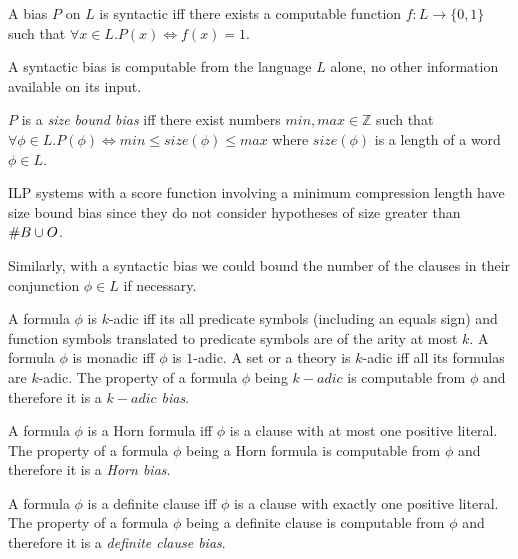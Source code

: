 \begin{defn}
A bias $P$ on $L$ is syntactic iff there exists a computable function $f:L \to \{0,1\}$ such that $\forall x \in L.P(x) \iff f(x)=1$.
\end{defn}

\begin{remark}
A syntactic bias is computable from the language $L$ alone, no other information available on its input.
\end{remark}

\begin{defn}
$P$ is a \emph{size bound bias} iff there exist numbers $min, max \in \mathbb{Z}$ such that $\forall \phi \in L. P(\phi) \iff min \le size(\phi) \le max$ where $size(\phi)$ is a length of a word $\phi \in L$.
\end{defn}

\begin{remark}
ILP systems with a score function involving a minimum compression length have size bound bias since they do not consider hypotheses of size greater than $\#B \cup O$.
\end{remark}

\begin{remark}
Similarly, with a syntactic bias we could bound the number of the clauses in their conjunction $\phi \in L$ if necessary.
\end{remark}

\begin{defn}
A formula $\phi$ is $k$-adic iff its all predicate symbols (including an equals sign) and function symbols translated to predicate symbols are of the arity at most $k$. A formula $\phi$ is monadic iff $\phi$ is $1$-adic. A set or a theory is $k$-adic iff all its formulas are $k$-adic. The property of a formula $\phi$ being $k-adic$ is computable from $\phi$ and therefore it is a \emph{$k-adic$ bias}.
\end{defn}

\begin{defn}
A formula $\phi$ is a Horn formula iff $\phi$ is a clause with at most one positive literal. The property of a formula $\phi$ being a Horn formula is computable from $\phi$ and therefore it is a \emph{Horn bias}.
\end{defn}

\begin{defn}
A formula $\phi$ is a definite clause iff $\phi$ is a clause with exactly one positive literal. The property of a formula $\phi$ being a definite clause is computable from $\phi$ and therefore it is a \emph{definite clause bias}.
\end{defn}

